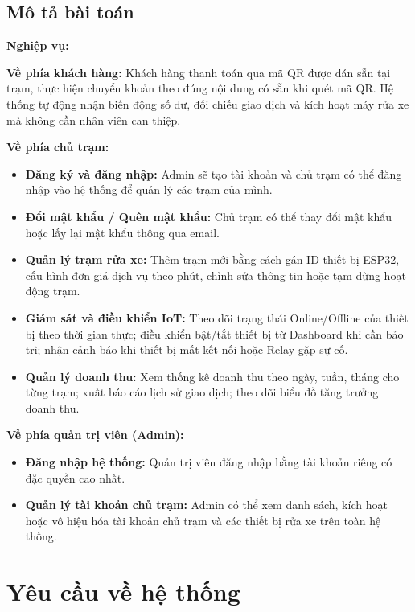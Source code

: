 \documentclass[../main.tex]{subfiles}
\begin{document}
\subsection{Mô tả bài toán}

\textbf{Nghiệp vụ:}

\textbf{Về phía khách hàng:} Khách hàng thanh toán qua mã QR được dán sẵn tại trạm, thực hiện chuyển khoản theo đúng nội dung có sẵn khi quét mã QR. Hệ thống tự động nhận biến động số dư, đối chiếu giao dịch và kích hoạt máy rửa xe mà không cần nhân viên can thiệp.

\textbf{Về phía chủ trạm:}
\begin{itemize}
    \item \textbf{Đăng ký và đăng nhập:} Admin sẽ tạo tài khoản và chủ trạm có thể đăng nhập vào hệ thống để quản lý các trạm của mình.
    \item \textbf{Đổi mật khẩu / Quên mật khẩu:} Chủ trạm có thể thay đổi mật khẩu hoặc lấy lại mật khẩu thông qua email.
    \item \textbf{Quản lý trạm rửa xe:} Thêm trạm mới bằng cách gán ID thiết bị ESP32, cấu hình đơn giá dịch vụ theo phút, chỉnh sửa thông tin hoặc tạm dừng hoạt động trạm.
    \item \textbf{Giám sát và điều khiển IoT:} Theo dõi trạng thái Online/Offline của thiết bị theo thời gian thực; điều khiển bật/tắt thiết bị từ Dashboard khi cần bảo trì; nhận cảnh báo khi thiết bị mất kết nối hoặc Relay gặp sự cố.
    \item \textbf{Quản lý doanh thu:} Xem thống kê doanh thu theo ngày, tuần, tháng cho từng trạm; xuất báo cáo lịch sử giao dịch; theo dõi biểu đồ tăng trưởng doanh thu.
\end{itemize}

\textbf{Về phía quản trị viên (Admin):}
\begin{itemize}
    \item \textbf{Đăng nhập hệ thống:} Quản trị viên đăng nhập bằng tài khoản riêng có đặc quyền cao nhất.
    \item \textbf{Quản lý tài khoản chủ trạm:} Admin có thể xem danh sách, kích hoạt hoặc vô hiệu hóa tài khoản chủ trạm và các thiết bị rửa xe trên toàn hệ thống.
\end{itemize}

\section{Yêu cầu về hệ thống}
\end{document}
